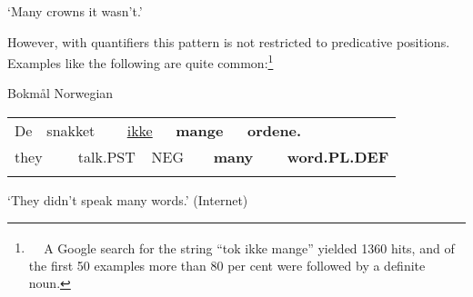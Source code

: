 \begin{styleTranslation}
‘Many crowns it wasn’t.’

\end{styleTranslation}

\begin{styleBodyTextFirst}
However, with quantifiers this pattern is not restricted to predicative positions. Examples like the following are quite common:\footnote{\textsuperscript{\ \ } A Google search for the string “tok ikke mange” yielded 1360 hits, and of the first 50 examples more than 80 per cent were followed by a definite noun.}

\end{styleBodyTextFirst}

\begin{listWWNumileveli}
\item 

\begin{styleExample}
Bokmål Norwegian 

\end{styleExample}

\end{listWWNumileveli}

\begin{listWWNumxlileveli}
\item 

\end{listWWNumxlileveli}

\begin{tabular}{llllllllll}
\lsptoprule
De & \multicolumn{2}{l}{snakket

} & \multicolumn{2}{l}{\hyperlink{here}{ikke}

} & \multicolumn{2}{l}{{\bfseries mange}

} & \multicolumn{2}{l}{{\bfseries ordene.}

} & \\
\multicolumn{2}{l}{they

} & \multicolumn{2}{l}{talk.PST

} & \multicolumn{2}{l}{NEG

} & \multicolumn{2}{l}{{\bfseries many}

} & \multicolumn{2}{l}{{\bfseries word.PL.DEF}

}\\
\lspbottomrule
\end{tabular}

\begin{styleTranslation}
‘They didn’t speak many words.’ (Internet)

\end{styleTranslation}

